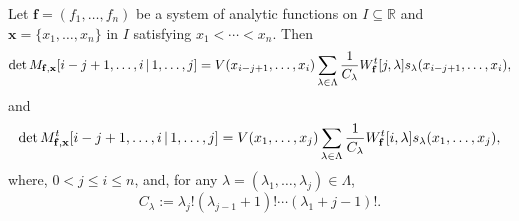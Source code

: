 \documentclass[smallextended]{svjour3}       %
\begin{document}
\begin{theorem} \label{theo1}
Let  \( \mathbf{f} = (f_1, \ldots, f_n) \) be a system of analytic functions on \( I \subseteq \mathbb{R} \) and   \( \mathbf{x} = \{ x_1 , \ldots, x_n \} \) in \( I \) satisfying \( x_1 < \cdots < x_n \). Then 
\begin{equation}\label{MWT}
    \det M_{\bf f, \bf x}  {[i-j+1,\dots,i\,|\,1,\dots, j]}
 = V(x_{i-j+1},\dots,x_i)  \sum_{\lambda\in \Lambda}\frac{1}{C_\lambda}W^t_{{\bf f}}{[j,\lambda]}s_{\lambda}(x_{i-j+1},\dots,x_i),
\end{equation}
   and
   \begin{equation}\label{MWTt}
  \det M_{\bf f, \bf x}^t {[i-j+1,\dots,i\,|\,1,\dots, j]}
 = V(x_{1},\dots,x_j) \sum_{\lambda\in \Lambda}\frac{1}{C_\lambda}W^t_{{\bf f}}{[i,\lambda]}s_{\lambda}(x_{1},\dots,x_j),
\end{equation} 
where, $0 < j \leq i \leq n$, and,  for any $\lambda=(\lambda_1,\ldots,\lambda_j) \in \Lambda$,
\begin{equation}\label{eq:CLambda}
    C_\lambda:=\lambda_j!(\lambda_{j-1}+1)!\cdots (\lambda_1+j-1)!.
\end{equation}
     
\end{theorem}
\end{document}
